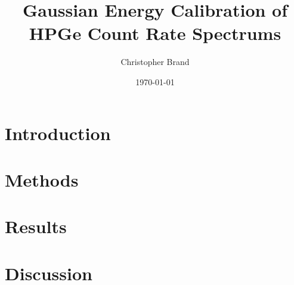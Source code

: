 \documentclass[11pt]{article}
\title{Gaussian Energy Calibration of HPGe Count Rate Spectrums}
\author{Christopher Brand}
\date{\today}
\begin{document}
\maketitle

\section{Introduction}
\label{sec:intro}


\section{Methods}
\label{sec:meth}


\section{Results}
\label{sec:res}


\section{Discussion}
\label{sec:disc}




\end{document}
